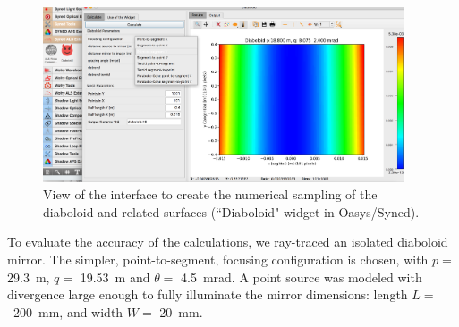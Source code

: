 \documentclass{iucr}       %
\begin{document}
\begin{figure}\label{fig:widget}
\centering
\includegraphics[width=0.95\textwidth]{figures/widget.png}
\caption{View of the interface to create the numerical sampling of the diaboloid and related surfaces (``Diaboloid" widget in Oasys/Syned).}
\end{figure}

To evaluate the accuracy of the calculations, we ray-traced an isolated diaboloid mirror. The simpler, point-to-segment, focusing configuration is chosen, with $p=$ 29.3~m, $q=$ 19.53~m and $\theta=$ 4.5~mrad. A point source was modeled with divergence large enough to fully illuminate the mirror dimensions: length $L=$~200~mm, and width $W=$ 20~mm.
\end{document}
